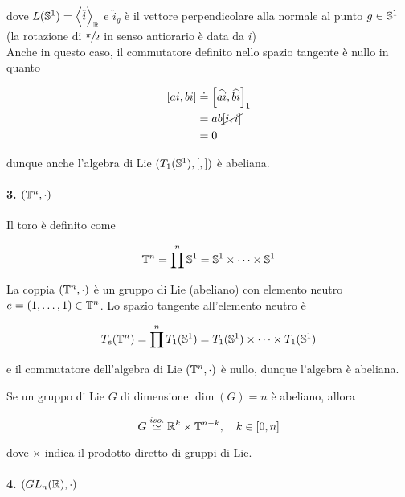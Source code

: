 dove $ L(\S^{1}) = \expval{\hat{i}}_{\R} $ e $ \hat{i}_{g} $ è il vettore perpendicolare alla normale al punto $ g \in \S^{1} $ (la rotazione di $ \sfrac{\pi}{2} $ in senso antiorario è data da $ i $)\\
Anche in questo caso, il commutatore definito nello spazio tangente è nullo in quanto

\begin{align}
	\begin{split}
		\comm{a i}{b i} &\doteq \comm{\widehat{a i}}{\widehat{b i}}_{1}\\
		&= a b \cancel{ \comm{i}{i} }\\
		&= 0
	\end{split}
\end{align}

dunque anche l'algebra di Lie $ (T_{1}(\S^{1}),[,]) $ è abeliana.

\paragraph{3. $ (\T^{n},\cdot) $}

Il toro è definito come

\begin{equation}
	\T^{n} = \prod^{n} \S^{1} = \S^{1} \times \cdots \times \S^{1}
\end{equation}

La coppia $ (\T^{n},\cdot) $ è un gruppo di Lie (abeliano) con elemento neutro $ e = (1,\dots,1) \in \T^{n} $. Lo spazio tangente all'elemento neutro è

\begin{equation}
	T_{e}(\T^{n}) = \prod^{n} T_{1}(\S^{1}) = T_{1}(\S^{1}) \times \cdots \times T_{1}(\S^{1})
\end{equation}

e il commutatore dell'algebra di Lie $ (\T^{n},\cdot) $ è nullo, dunque l'algebra è abeliana.

\begin{definition}
	Se un gruppo di Lie $ G $ di dimensione $ \dim(G) = n $ è abeliano, allora
	
	\begin{equation}
		G \stackrel{iso.}{\simeq} \R^{k} \times \T^{n-k} \qcomma k \in [0,n]
	\end{equation}

	dove $ \times $ indica il prodotto diretto di gruppi di Lie.
\end{definition}

\paragraph{4. $ (GL_{n}(\R),\cdot) $}

